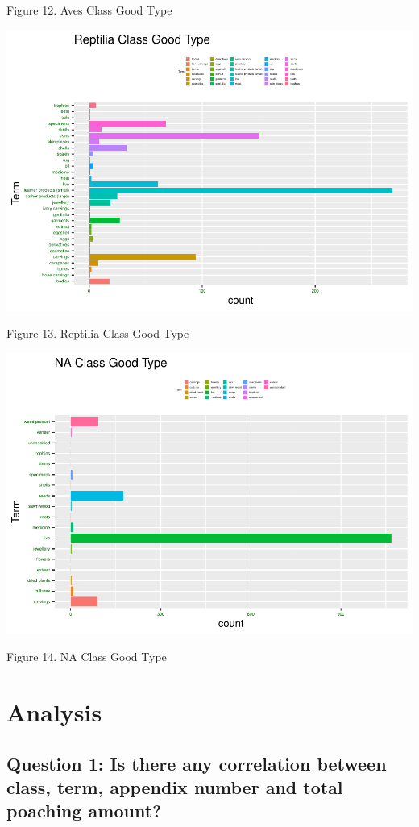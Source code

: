 \documentclass[
  12pt,
]{article}
\begin{document}
Figure 12. Aves Class Good Type

\includegraphics{Wood_ENV872_Project_files/figure-latex/unnamed-chunk-17-1.pdf}

Figure 13. Reptilia Class Good Type

\includegraphics{Wood_ENV872_Project_files/figure-latex/unnamed-chunk-18-1.pdf}

Figure 14. NA Class Good Type

\newpage

\hypertarget{analysis}{%
\section{Analysis}\label{analysis}}

\hypertarget{question-1-is-there-any-correlation-between-class-term-appendix-number-and-total-poaching-amount}{%
\subsection{Question 1: Is there any correlation between class, term,
appendix number and total poaching
amount?}\label{question-1-is-there-any-correlation-between-class-term-appendix-number-and-total-poaching-amount}}
\end{document}

